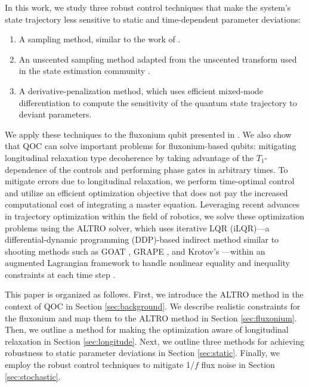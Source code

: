 In this work, we study three robust control techniques that
make the system's state trajectory less sensitive
to static and time-dependent parameter deviations:
\begin{enumerate}
  \item A sampling method, similar to the work of \cite{allen2019robust,
    carvalho2020error, reinhold2019controlling, rembold2020introduction}.
  \item An unscented sampling method adapted from the unscented transform used in the 
    state estimation community \cite{howell2020direct, julier2004unscented,
      lee2013sigma, manchester2016derivative}.
  \item A derivative-penalization method, which uses efficient mixed-mode differentiation
    to compute the sensitivity of the quantum state trajectory
    to deviant parameters.
\end{enumerate}
We apply these techniques to the fluxonium qubit presented in \cite{zhang2020universal}.
We also show that QOC can solve important problems for fluxonium-based qubits: mitigating
longitudinal relaxation type decoherence
by taking advantage of the $T_{1}$-dependence of the controls
and performing phase gates in arbitrary times.
To mitigate errors due to longitudinal
relaxation, we perform time-optimal control and
utilize an efficient optimization objective that does
not pay the increased computational cost of integrating a master equation.
Leveraging recent advances in trajectory optimization within the field of robotics, we
solve these optimization problems using the ALTRO solver, which uses iterative LQR 
(iLQR)---a differential-dynamic programming (DDP)-based indirect method similar to shooting
methods such as GOAT \cite{machnes2015gradient}, GRAPE
\cite{khaneja2005optimal, leung2017speedup}, and Krotov's \cite{goerz2019krotov}---within 
an augmented Lagrangian framework to handle nonlinear equality and inequality constraints at 
each time step \cite{howell2019altro}. 

This paper is organized as follows.
First, we introduce the ALTRO method in the context of QOC
in Section \ref{sec:background}.
We describe realistic constraints for the fluxonium and
map them to the ALTRO method in Section \ref{sec:fluxonium}. Then, we
outline a method for making the optimization aware of longitudinal
relaxation in Section \ref{sec:longitude}. Next, we outline three methods for achieving
robustness to static parameter deviations in Section \ref{sec:static}. Finally,
we employ the robust control techniques to mitigate 1/$f$ flux noise
in Section \ref{sec:stochastic}.
